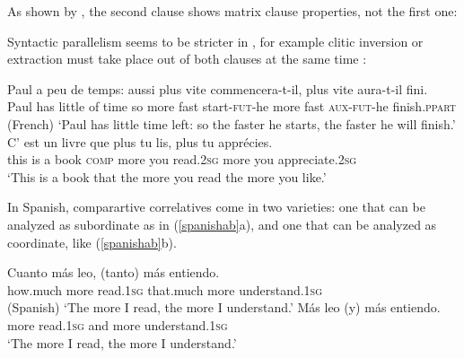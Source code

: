 \documentclass[output=paper
                ,modfonts
                ,nonflat
	        ,collection
	        ,collectionchapter
	        ,collectiontoclongg
 	        ,biblatex
                ,babelshorthands
                ,newtxmath
                ,draftmode
                ,colorlinks, citecolor=brown
]{./langsci/langscibook}
\begin{document}
{As shown by \citet[549--550]{culijack}, the second clause shows matrix clause properties, not the first one:

\begin{exe}
 \ex
\begin{xlista}
\end{xlista}
\end{exe}

Syntactic parallelism seems to be stricter in , for example clitic inversion or extraction
must take place out of both clauses at the same time \citep[]{Abeille:Borsley:08}:

\begin{exe}
 \ex
\begin{xlista}
\ex 
\gll Paul a     peu  de temps: aussi plus  vite commencera-t-il,  plus   vite  aura-t-il  fini.\\
     Paul has little of time so more fast start-\textsc{fut}-he more fast  \textsc{aux}-\textsc{fut}-he finish.\textsc{ppart} \\\hfill{(French)}
\glt `Paul has little time left: so the faster he starts, the faster he will finish.'
\ex \gll C'   est un livre  que      plus   tu    lis, plus  tu    appr\'{e}cies. \\
this is    a  book \textsc{comp} more you read.2\textsc{sg}  more you appreciate.2\textsc{sg} \\
\glt `This is a book that the more you read the more you like.'
\end{xlista}
\end{exe}

In Spanish, comparartive correlatives come in two varieties: one that can be analyzed as subordinate
as in (\ref{spanishab}a), 
 and one that can be analyzed as coordinate, like  (\ref{spanishab}b).

\begin{exe}
 \ex
\begin{xlista}
\ex 
\gll Cuanto   m\'{a}s leo,     (tanto)        m\'{a}s entiendo. \\
     how.much more    read.1\textsc{sg} that.much more understand.1\textsc{sg} \\\hfill{(Spanish)}
\glt `The more I read, the more I understand.'
\ex 
\gll	M\'{a}s leo        (y) m\'{a}s entiendo. \\
	more read.1\textsc{sg} and more understand.1\textsc{sg} \\
\glt `The more I read, the more I understand.'\\ 
 \citep[]{Abeille:Borsley:Espinal:06}
\end{xlista}\label{spanishab}
\end{exe}

}
\end{document}
